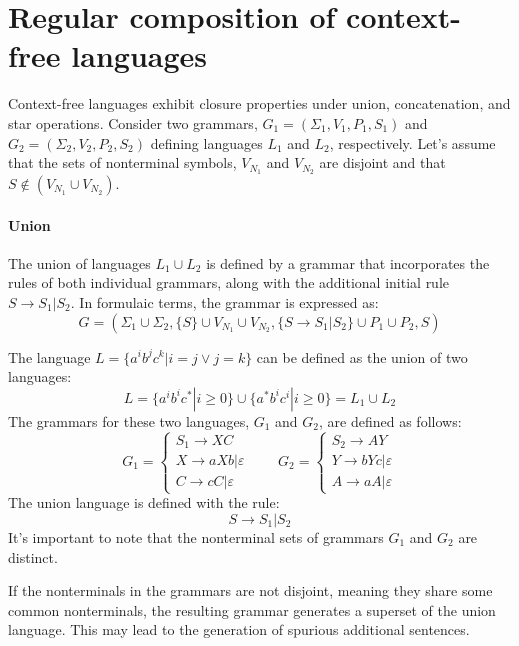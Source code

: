 \section{Regular composition of context-free languages}

Context-free languages exhibit closure properties under union, concatenation, and star operations.
Consider two grammars, $G_1=(\Sigma_1,V_1,P_1,S_1)$ and $G_2=(\Sigma_2,V_2,P_2,S_2)$ defining languages $L_1$ and $L_2$, respectively.
Let's assume that the sets of nonterminal symbols, $V_{N_1}$ and $V_{N_2}$ are disjoint and that $S \notin (V_{N_1} \cup V_{N_2})$. 

\paragraph*{Union}
The union of languages $L_1 \cup L_2$ is defined by a grammar that incorporates the rules of both individual grammars, along with the additional initial rule $S\rightarrow S_1|S_2$. 
In formulaic terms, the grammar is expressed as:
\[G=\left(\Sigma_1 \cup \Sigma_2,\{S\} \cup V_{N_1} \cup V_{N_2},\{S\rightarrow S_1|S_2\} \cup P_1 \cup P_2,S\right)\]
\begin{example}
    The language $L=\{a^ib^jc^k|i=j \lor j=k\}$ can be defined as the union of two languages:
    \[L=\{a^ib^ic^{*}|i \geq 0\} \cup \{a^{*}b^ic^i|i \geq 0\}=L_1 \cup L_2\]
    The grammars for these two languages, $G_1$ and $G_2$, are defined as follows:
    \[G_1=\begin{cases}
        S_1 \rightarrow XC \\
        X \rightarrow aXb|\varepsilon \\
        C \rightarrow cC|\varepsilon
    \end{cases}\qquad G_2=
    \begin{cases}
        S_2 \rightarrow AY \\
        Y \rightarrow bYc|\varepsilon \\
        A \rightarrow aA|\varepsilon
    \end{cases}\]
    The union language is defined with the rule:
    \[S \rightarrow S_1|S_2\]
    It's important to note that the nonterminal sets of grammars $G_1$ and $G_2$ are distinct.
\end{example}
If the nonterminals in the grammars are not disjoint, meaning they share some common nonterminals, the resulting grammar generates a superset of the union language.
This may lead to the generation of spurious additional sentences.

